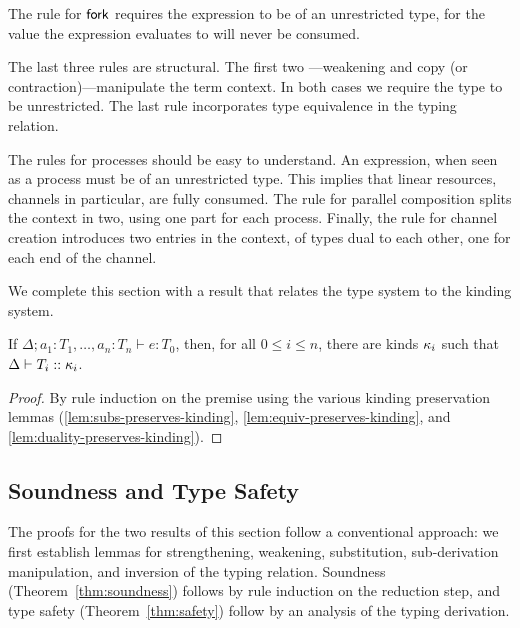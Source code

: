 The rule for $\mathsf{fork}$ requires the expression to be of an unrestricted
type, for the value the expression evaluates to will never be
consumed.

The last three rules are structural. The first two ---weakening and
copy (or contraction)---manipulate the term context. In both cases
we require the type to be unrestricted. The last rule incorporates
type equivalence in the typing relation.

The rules for processes should be easy to understand. An expression,
when seen as a process must be of an unrestricted type. This implies
that linear resources, channels in particular, are fully consumed. The
rule for parallel composition splits the context in two, using one
part for each process. Finally, the rule for channel creation
introduces two entries in the context, of types dual to each other,
one for each end of the channel.

We complete this section with a result that relates the type system to
the kinding system.

\begin{lemma}[Agreement]
  If $\Delta;a_1\colon T_1,\dots,a_n\colon T_n \vdash e : T_0$, then,
  for all $0\le i\le n$, there are kinds $\kappa_i$ such that
  $\Delta \vdash T_i:: \kappa_i$.
\end{lemma}
%
\begin{proof}
  By rule induction on the premise using the various kinding
  preservation lemmas (\ref{lem:subs-preserves-kinding},
  \ref{lem:equiv-preserves-kinding}, and
  \ref{lem:duality-preserves-kinding}).
\end{proof}


\subsection{Soundness and Type Safety}

The proofs for the two results of this section follow a conventional
approach: we first establish lemmas for strengthening, weakening,
substitution, sub-derivation manipulation, and inversion of the typing
relation. Soundness (Theorem~\ref{thm:soundness}) follows by rule
induction on the reduction step, and type safety
(Theorem~\ref{thm:safety}) follow by an analysis of the typing
derivation.

